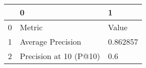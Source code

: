 \begin{tabular}{lll}
\toprule
{} &                       0 &         1 \\
\midrule
0 &                  Metric &     Value \\
1 &       Average Precision &  0.862857 \\
2 &  Precision at 10 (P@10) &       0.6 \\
\bottomrule
\end{tabular}
